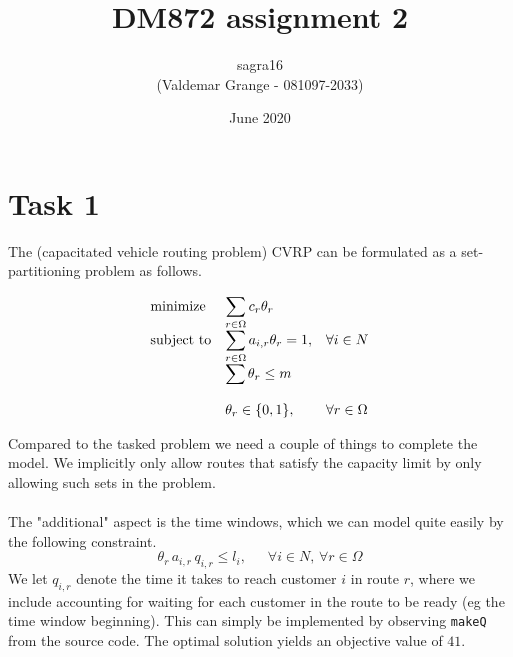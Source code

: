 \documentclass{article}
\title{DM872 assignment 2}
\author{sagra16 \\(Valdemar Grange - 081097-2033) }
\date{June 2020}
\begin{document}
    \maketitle
    
    \clearpage

    \section*{Task 1}
    The (capacitated vehicle routing problem) CVRP can be formulated as a set-partitioning problem as follows.

    \begin{equation*}
        \begin{array}{ll@{}ll}
            \text{minimize}  & \displaystyle\sum_{r \in \Omega} c_r \theta_r& &\\
            \text{subject to}& \displaystyle\sum_{r \in \Omega} a_{i, r} \theta_r = 1 ,&   &\forall i \in N\\
                             & \displaystyle\sum \theta_r \leq m &&\\\\
                             & \displaystyle \theta_r  \in \{0,1\},  && \forall r \in \Omega
        \end{array}
    \end{equation*}
    
    Compared to the tasked problem we need a couple of things to complete the model.
    We implicitly only allow routes that satisfy the capacity limit by only allowing such sets in the problem.\\\\
    The "additional" aspect is the time windows, which we can model quite easily by the following constraint.
    \[
    \theta_r \, a_{i,r} \, q_{i,r} \leq l_i   , \,\,\,\,\,\,\,\,\, \forall i \in N, \, \forall r \in \Omega
    \]
    We let $q_{i,r}$ denote the time it takes to reach customer $i$ in route $r$, where we include accounting for waiting for each customer in the route to be ready (eg the time window beginning).
    This can simply be implemented by observing \texttt{makeQ} from the source code.
    The optimal solution yields an objective value of $41$.

    \clearpage
\end{document}
